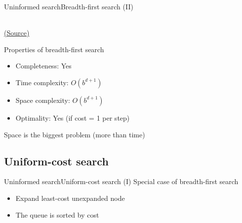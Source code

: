 \documentclass[10pt,compress]{beamer} %
\begin{document}
\begin{frame}{Uninformed search}{Breadth-first search (II)}
      \begin{center}
          \setlength{\fboxrule}{0pt}
           \\
          \tiny{\href{http://aima.cs.berkeley.edu/index.html}{(Source)}}
      \end{center}

      \bigskip

      Properties of breadth-first search
      \begin{itemize}
        \item Completeness: Yes
        \item Time complexity: $O(b^{d+1})$
        \item Space complexity: $O(b^{d+1})$
        \item Optimality: Yes (if cost = 1 per step)
      \end{itemize}
      Space is the biggest problem (more than time)
\end{frame}

\subsection{Uniform-cost search}

\begin{frame}{Uninformed search}{Uniform-cost search (I)}
    Special case of breadth-first search
    \begin{itemize}
        \item Expand least-cost unexpanded node
        \item The queue is sorted by cost
    \end{itemize}

    \begin{columns}
                \setlength{\fboxrule}{0pt}
                \setlength{\fboxrule}{0pt}
    \end{columns}
\end{frame}
\end{document}
